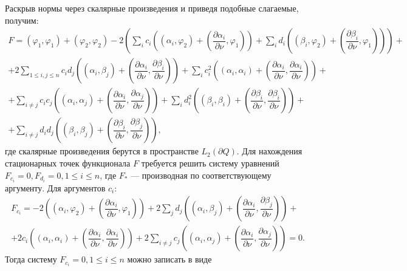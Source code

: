 \documentclass[a4paper, 12pt]{article}
\begin{document}
Раскрыв нормы через скалярные произведения и приведя подобные слагаемые, получим:
\begin{multline}
  F=(\varphi_1,\varphi_1)+(\varphi_2,\varphi_2) - 2 \left(\sum_i c_i \left((\alpha_i,\varphi_2)+\left(\dfrac{\partial \alpha_i}{\partial \nu},\varphi_1\right)  \right)  + \sum_i d_i \left((\beta_i,\varphi_2)+\left(\dfrac{\partial \beta_i}{\partial \nu},\varphi_1\right)  \right) \right)+\\
  +2\sum_{1 \leq i,j \leq n} c_i d_j \left((\alpha_i,\beta_j)+\left(\dfrac{\partial \alpha_i}{\partial \nu},\dfrac{\partial \beta_i}{\partial \nu}\right)  \right)+
  \sum_i c_i^2 \left(  (\alpha_i,\alpha_i)+\left(\dfrac{\partial \alpha_i}{\partial \nu},\dfrac{\partial \alpha_i}{\partial \nu}\right)  \right)+\\
  +\sum_{i \ne j} c_i c_j \left(  (\alpha_i,\alpha_j)+\left(\dfrac{\partial \alpha_i}{\partial \nu},\dfrac{\partial \alpha_j}{\partial \nu}\right)\right)+
  \sum_i d_i^2 \left(  (\beta_i,\beta_i)+\left(\dfrac{\partial \beta_i}{\partial \nu},\dfrac{\partial \beta_i}{\partial \nu}\right)  \right)+\\
  +\sum_{i \ne j} d_i d_j \left(  (\beta_i,\beta_j)+\left(\dfrac{\partial \beta_i}{\partial \nu},\dfrac{\partial \beta_j}{\partial \nu}\right)\right),
\label{func}
\end{multline}
где скалярные произведения берутся в пространстве $L_2(\partial Q)$.
Для нахождения стационарных точек функционала $F$ требуется решить систему уравнений $F_{c_i}=0, F_{d_i}=0, 1\leq i \leq n$, где
$F_*$ --- производная по соответствующему аргументу. Для аргументов $c_i$:
\begin{multline}
  F_{c_i}=-2\left((\alpha_i,\varphi_2)+\left( \dfrac{\partial \alpha_i}{\partial \nu},\varphi_1 \right)\right)+ 2 \sum_j d_j \left((\alpha_i,\beta_j)+\left( \dfrac{\partial \alpha_i}{\partial \nu},\dfrac{\partial \beta_j}{\partial \nu} \right)\right)+\\
  +2 c_i \left((\alpha_i,\alpha_i)+\left( \dfrac{\partial \alpha_i}{\partial \nu},\dfrac{\partial \alpha_i}{\partial \nu} \right)\right)+2\sum_{i \ne j} c_j \left((\alpha_i,\alpha_j)+\left( \dfrac{\partial \alpha_i}{\partial \nu},\dfrac{\partial \alpha_j}{\partial \nu} \right)\right)=0.
\end{multline}  
Тогда систему $F_{c_i}=0,1\leq i \leq n$ можно записать в виде
\end{document}
